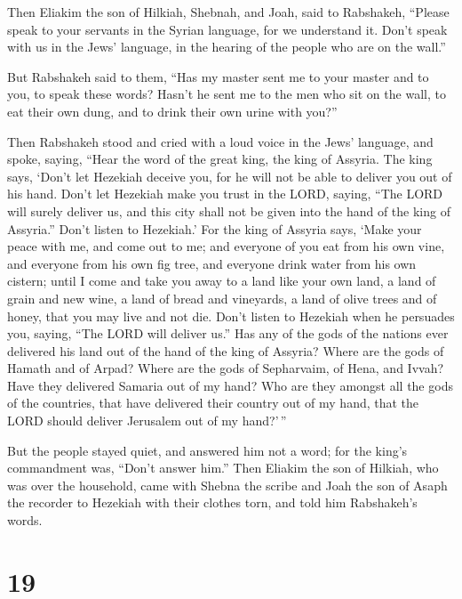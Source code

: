  Then Eliakim the son of Hilkiah, Shebnah, and Joah, said
to Rabshakeh, ``Please speak to your servants in the Syrian language,
for we understand it. Don't speak with us in the Jews' language, in the
hearing of the people who are on the wall.''

 But Rabshakeh said to them, ``Has my master sent me to
your master and to you, to speak these words? Hasn't he sent me to the
men who sit on the wall, to eat their own dung, and to drink their own
urine with you?''

 Then Rabshakeh stood and cried with a loud voice in the
Jews' language, and spoke, saying, ``Hear the word of the great king,
the king of Assyria.  The king says, `Don't let Hezekiah
deceive you, for he will not be able to deliver you out of his hand.
 Don't let Hezekiah make you trust in the LORD, saying,
``The LORD will surely deliver us, and this city shall not be given into
the hand of the king of Assyria.''  Don't listen to
Hezekiah.' For the king of Assyria says, `Make your peace with me, and
come out to me; and everyone of you eat from his own vine, and everyone
from his own fig tree, and everyone drink water from his own cistern;
 until I come and take you away to a land like your own
land, a land of grain and new wine, a land of bread and vineyards, a
land of olive trees and of honey, that you may live and not die. Don't
listen to Hezekiah when he persuades you, saying, ``The LORD will
deliver us.''  Has any of the gods of the nations ever
delivered his land out of the hand of the king of Assyria? 
Where are the gods of Hamath and of Arpad? Where are the gods of
Sepharvaim, of Hena, and Ivvah? Have they delivered Samaria out of my
hand?  Who are they amongst all the gods of the countries,
that have delivered their country out of my hand, that the LORD should
deliver Jerusalem out of my hand?'\,''

 But the people stayed quiet, and answered him not a word;
for the king's commandment was, ``Don't answer him.''  Then
Eliakim the son of Hilkiah, who was over the household, came with Shebna
the scribe and Joah the son of Asaph the recorder to Hezekiah with their
clothes torn, and told him Rabshakeh's words.

\hypertarget{section-18}{%
\section{19}\label{section-18}}

